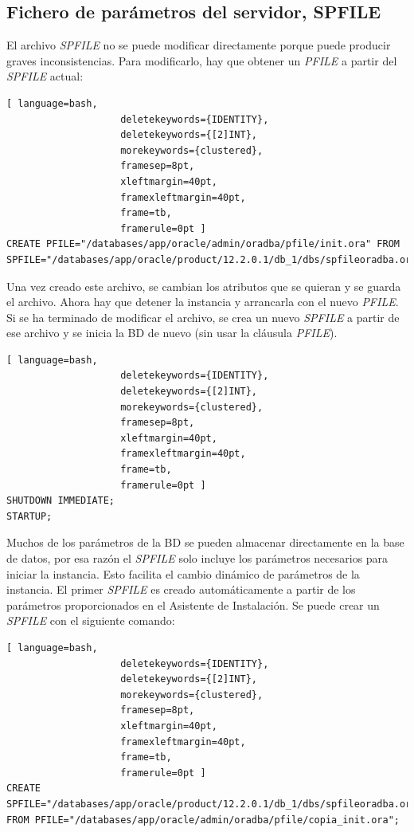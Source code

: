 \subsection{Fichero de parámetros del servidor, SPFILE}

El archivo \textit{SPFILE} no se puede modificar directamente porque puede producir graves inconsistencias. Para modificarlo, hay que obtener un \textit{PFILE} a partir del \textit{SPFILE} actual:
\begin{lstlisting}[ language=bash,
                    deletekeywords={IDENTITY},
                    deletekeywords={[2]INT},
                    morekeywords={clustered},
                    framesep=8pt,
                    xleftmargin=40pt,
                    framexleftmargin=40pt,
                    frame=tb,
                    framerule=0pt ]
CREATE PFILE="/databases/app/oracle/admin/oradba/pfile/init.ora" FROM SPFILE="/databases/app/oracle/product/12.2.0.1/db_1/dbs/spfileoradba.ora";
\end{lstlisting}
Una vez creado este archivo, se cambian los atributos que se quieran y se guarda el archivo. Ahora hay que detener la instancia y arrancarla con el nuevo \textit{PFILE}. Si se ha terminado de modificar el archivo, se crea un nuevo \textit{SPFILE} a partir de ese archivo y se inicia la BD de nuevo (sin usar la cláusula \textit{PFILE}).
\begin{lstlisting}[ language=bash,
                    deletekeywords={IDENTITY},
                    deletekeywords={[2]INT},
                    morekeywords={clustered},
                    framesep=8pt,
                    xleftmargin=40pt,
                    framexleftmargin=40pt,
                    frame=tb,
                    framerule=0pt ]
SHUTDOWN IMMEDIATE;
STARTUP;
\end{lstlisting}
Muchos de los parámetros de la BD se pueden almacenar directamente en la base de datos, por esa razón el \textit{SPFILE} solo incluye los parámetros necesarios para iniciar la instancia. Esto facilita el cambio dinámico de parámetros de la instancia. El primer \textit{SPFILE} es creado automáticamente a partir de los parámetros proporcionados en el Asistente de Instalación. Se puede crear un \textit{SPFILE} con el siguiente comando:
\begin{lstlisting}[ language=bash,
                    deletekeywords={IDENTITY},
                    deletekeywords={[2]INT},
                    morekeywords={clustered},
                    framesep=8pt,
                    xleftmargin=40pt,
                    framexleftmargin=40pt,
                    frame=tb,
                    framerule=0pt ]
CREATE SPFILE="/databases/app/oracle/product/12.2.0.1/db_1/dbs/spfileoradba.ora" FROM PFILE="/databases/app/oracle/admin/oradba/pfile/copia_init.ora";
\end{lstlisting}

